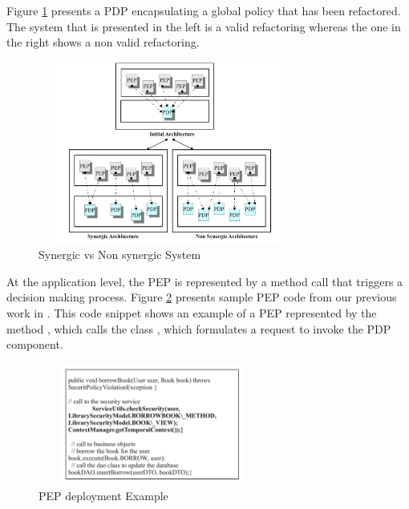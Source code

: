 Figure \ref{Synergicvsnonsynergicarchitecture} presents a PDP encapsulating a global policy that has been refactored. The system that is 
presented in the left is a valid refactoring whereas the one in the right shows a non valid refactoring.
\begin{figure}[!h]
\begin{center}
\includegraphics[width=8.5cm, height=6cm]{synergic-nonsynergic}
\caption{Synergic vs Non synergic System}
\label{Synergicvsnonsynergicarchitecture}
\end{center}
\end{figure}

At the application level, the PEP is represented by a method call that triggers a decision making process.
Figure \ref{PEPdeploymentexample} presents sample PEP code from our previous work in \cite{legacy}. This code snippet
 shows an example of a PEP 
represented by the method , which calls the class 
, which formulates a request to invoke the PDP component.

\begin{figure}[!h]
\begin{center}
\includegraphics[width=7.5cm, height=4cm]{PEPExample}
\caption{PEP deployment Example}
\label{PEPdeploymentexample}
\end{center}
\end{figure}

